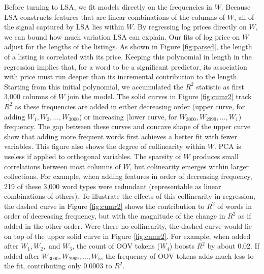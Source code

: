 \documentclass[12pt]{article}
\begin{document}
 Before turning to LSA, we fit models directly on the frequencies in $W$.
  Because LSA constructs features that are linear combinations of the columns of
 $W$, all of the signal captured by LSA lies within $W$.  By regressing log
 prices directly on $W$, we can bound how much variation LSA can explain.  Our
 fits of log price on $W$ adjust for the lengths of the listings.  As shown in
 Figure \ref{fig:parsed}, the length of a listing is correlated with its price.
  Keeping this polynomial in length in the regression implies that, for a word
 to be a significant predictor, its association with price must run deeper than
 its incremental contribution to the length.  Starting from this initial
 polynomial, we accumulated the $R^2$ statistic as first 3,000 columns of $W$
 join the model.  The solid curves in Figure \ref{fig:cumr2} track $R^2$ as
 these frequencies are added in either decreasing order (upper curve, for adding
 $W_1,W_2,\ldots,W_{3000}$) or increasing (lower curve, for $W_{3000},
 W_{2999},\ldots, W_1$) frequency.  The gap between these curves and concave
 shape of the upper curve show that adding more frequent words first achieves a
 better fit with fewer variables. This figure also shows the degree of
 collinearity within $W$.  PCA is useless if applied to orthogonal
 variables. The sparsity of $W$ produces small correlations between most columns
 of $W$, but colinearity emerges within larger collections.  For example, when
 adding features in order of decreasing frequency, 219 of these 3,000 word types
 were redundant (representable as linear combinations of others).  To illustrate
 the effects of this collinearity in regression, the dashed curve in Figure
 \ref{fig:cumr2} shows the contribution to $R^2$ of words in order of decreasing
 frequency, but with the magnitude of the change in $R^2$ as if added in the
 other order. Were there no collinearity, the dashed curve would lie on top of
 the upper solid curve in Figure \ref{fig:cumr2}.  For example, when added after
 $W_1,W_2,$ and $W_3$, the count of OOV tokens ($W_4$) boosts $R^2$ by about
 0.02.  If added after $W_{3000},W_{2999}, \ldots, W_5$, the frequency of OOV
 tokens adds much less to the fit, contributing only 0.0003 to $R^2$.
\end{document}
